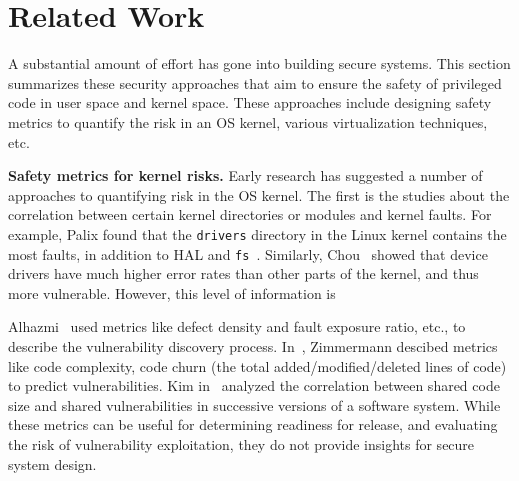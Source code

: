 \section{Related Work}
\label{sec.related_work}

A substantial amount of effort has gone into building secure systems. 
This section summarizes these security approaches 
that aim to ensure the safety of privileged code in user space and kernel space.
These approaches include designing safety metrics to quantify the risk in an 
OS kernel, various virtualization techniques, etc.


\textbf{Safety metrics for kernel risks.}
Early research has suggested a number of approaches to quantifying risk 
in the OS kernel. The first is the studies about the correlation between certain 
kernel directories or modules and kernel faults. For example, 
Palix found that the \texttt{drivers} directory in the Linux kernel contains the
most faults, in addition to HAL and \texttt{fs}~\cite{palix2011faults}. Similarly, 
Chou~\cite{PittSFIeld} showed that device drivers have
much higher error rates than other parts of the kernel, and thus more vulnerable.
However, this level of information is 

Alhazmi~\cite{alhazmi2008application} used metrics like defect density and 
fault exposure ratio, etc., to describe the vulnerability discovery process. 
In~\cite{zimmermann2010searching}, Zimmermann descibed metrics like 
code complexity, code churn (the total added/modified/deleted lines of 
code) to predict vulnerabilities. Kim in~\cite{kim2007vulnerability} analyzed
the correlation between shared code size and shared vulnerabilities in 
successive versions of a software system. While 
these metrics can be useful for determining readiness for release, and 
evaluating the risk of vulnerability exploitation, 
they do not provide insights for secure system design. 

